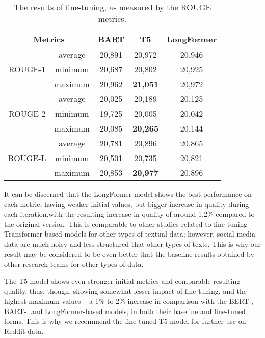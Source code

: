 \begin{table}[ht]%
	\centering
	\caption{The results of fine-tuning, as measured by the ROUGE metrics.}%
	\label{tab:rougeMetricsFineTuning}%
		\begin{tabular}{ c  c  c  c  c }%
			\toprule
			\multicolumn{2}{c}{Metrics} & BART & T5 & LongFormer \\
			\hline
			& average & 20,891 & 20,972 & 20,946\\
			ROUGE-1 & minimum & 20,687 & 20,802 & 20,925\\
			& maximum & 20,962 & \textbf{21,051} & 20,972\\
			& average & 20,025 & 20,189 & 20,125 \\
			ROUGE-2 & minimum & 19,725 & 20,005 & 20,042\\
			& maximum & 20,085 & \textbf{20,265} & 20,144\\
			& average & 20,781 & 20,896 & 20,865\\
			ROUGE-L & minimum & 20,501 & 20,735 & 20,821\\
			& maximum & 20,853 & \textbf{20,977} & 20,896\\
			\bottomrule
		\end{tabular}%
\end{table}

It can be discerned that the LongFormer model shows the best performance on each metric, having weaker initial values, but bigger increase in quality during each iteration,with the resulting increase in quality of around 1.2\% compared to the original version. This is comparable to other studies related to fine-tuning Transformer-based models for other types of textual data; however, social media data are much noisy and less structured that other types of texts. This is why our result may be considered to be even better that the baseline results obtained by other research teams for other types of data.

The T5 model shows even stronger initial metrics and comparable resulting quality, thus, though, showing somewhat lesser impact of fine-tuning, and the highest maximum values -- a 1\% to 2\% increase in comparison with the BERT-, BART-, and LongFormer-based models, in both their baseline and fine-tuned forms. This is why we recommend the fine-tuned T5 model for further use on Reddit data.

